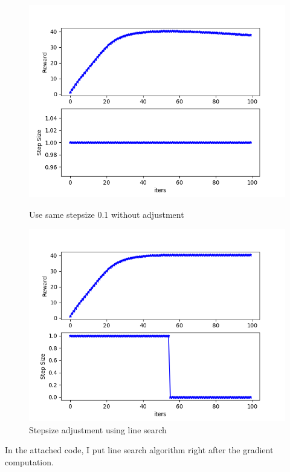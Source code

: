 \documentclass[11pt]{article}
\begin{document}
\begin{figure}[htbp]
  \centering
  \begin{minipage}[b]{0.45\textwidth}
    \includegraphics[width=\textwidth]{figures/no_line_search.png}
    \caption{Use same stepsize 0.1 without adjustment}
  \end{minipage}
  \hfill
  \begin{minipage}[b]{0.45\textwidth}
    \includegraphics[width=\textwidth]{figures/line_search.png}
    \caption{Stepsize adjustment using line search}
  \end{minipage}
\end{figure}
In the attached code, I put line search algorithm right after the gradient
computation.
\end{document}
